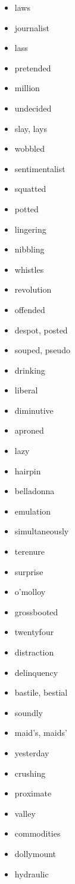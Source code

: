 \documentclass{article}
\begin{document}
\begin{itemize}
    \item laws
    \item journalist
    \item lass
    \item pretended
    \item million
    \item undecided
    \item slay, lays
    \item wobbled
    \item sentimentalist
    \item squatted
    \item potted
    \item lingering
    \item nibbling
    \item whistles
    \item revolution
    \item offended
    \item despot, posted
    \item souped, pseudo
    \item drinking
    \item liberal
    \item diminutive
    \item aproned
    \item lazy
    \item hairpin
    \item belladonna
    \item emulation
    \item simultaneously
    \item terenure
    \item surprise
    \item o'molloy
    \item grossbooted
    \item twentyfour
    \item distraction
    \item delinquency
    \item bastile, bestial
    \item soundly
    \item maid's, maids'
    \item yesterday
    \item crushing
    \item proximate
    \item valley
    \item commodities
    \item dollymount
    \item hydraulic

\end{itemize}
\end{document}
